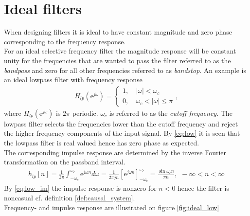 \section{Ideal filters} 
When designing filters it is ideal to have constant magnitude and zero phase corresponding to the frequency response. \\ For an ideal selective frequency filter the magnitude response will be constant unity for the frequencies that are wanted to pass the filter referred to as the \textit{bandpass} and zero for all other frequencies referred to as \textit{bandstop}. An example is an ideal lowpass filter with frequency response 
\begin{align}\label{eq:low}
H_{lp}(\text{e}^{j\omega})=
\left\{ \begin{matrix}
1, &\ \left| \omega \right|< \omega_c \\
0, &\ \omega_c < \left| \omega \right| \leq \pi
\end{matrix}\right.,
\end{align}     
where $H_{lp}(\text{e}^{j\omega})$ is $2\pi$ periodic. $\omega_c$ is referred to as the \textit{cutoff frequency}. The lowpass filter selects the frequencies lower than the cutoff frequency and reject the higher frequency components of the input signal. By \eqref{eq:low} it is seen that the lowpass filter is real valued hence has zero phase as expected. \\
The corresponding impulse response are determined by the inverse Fourier transformation on the passband interval.
\begin{align}\label{eq:low_im}
h_{lp}[n]=\frac{1}{2\pi}\int_{-\omega_c}^{\omega_c}\text{e}^{j\omega n} d\omega = \frac{1}{2\pi j n}\left[\text{e}^{j\omega n} \right]_{-\omega_c}^{\omega_c} = \frac{\sin \omega_c n}{\pi n }, \ \  -\infty < n < \infty
\end{align}  
By \eqref{eq:low_im} the impulse response is nonzero for $n<0$ hence the filter is noncasual cf. definition \ref{def:causal_system}.\\
Frequency- and impulse response are illustrated on figure \ref{fig:ideal_low}
